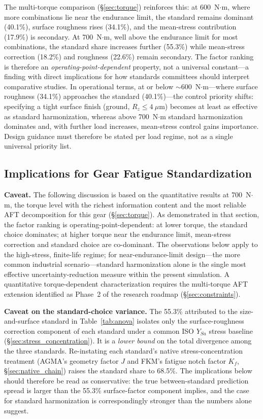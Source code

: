 \documentclass[twocolumn,12pt,a4paper]{article}
\begin{document}
The multi-torque comparison (\S\ref{sec:torque}) reinforces this:
at 600~N$\cdot$m, where more combinations lie near the endurance
limit, the standard remains dominant (40.1\%), surface roughness rises
(34.1\%), and the mean-stress contribution (17.9\%) is secondary. At
700~N$\cdot$m, well above the endurance limit for most combinations,
the standard share increases further (55.3\%) while mean-stress
correction (18.2\%) and roughness (22.6\%) remain secondary. The
factor ranking is therefore an
\emph{operating-point-dependent}
property, not a universal constant---a finding with direct implications
for how standards committees should interpret comparative studies. In
operational terms, at or below $\sim$600~N$\cdot$m---where surface
roughness (34.1\%) approaches the standard (40.1\%)---the control
priority shifts: specifying a tight surface finish (ground,
$R_z \leq 4~\mu$m) becomes at least as effective as standard
harmonization, whereas above 700~N$\cdot$m standard harmonization
dominates and, with further load increases, mean-stress control gains
importance. Design guidance must therefore be stated per load regime,
not as a single universal priority list.

\subsection{Implications for Gear Fatigue Standardization}

\textbf{Caveat.} The following discussion is based on the quantitative
results at 700~N$\cdot$m, the torque level with the richest
information content and the most reliable AFT decomposition for this
gear (\S\ref{sec:torque}). As
demonstrated in that section, the factor ranking is
operating-point-dependent: at lower torque, the standard choice
dominates; at higher torque near the endurance limit, mean-stress
correction and standard choice are co-dominant. The observations below
apply to
the high-stress, finite-life regime; for near-endurance-limit
design---the more common industrial scenario---standard harmonization
alone is the single most effective uncertainty-reduction measure
within the present simulation. A quantitative torque-dependent
characterization requires the
multi-torque AFT extension identified as Phase~2 of the research
roadmap (\S\ref{sec:constraints}).

\textbf{Caveat on the standard-choice variance.} The 55.3\% attributed
to the size-and-surface standard in Table~\ref{tab:anova} isolates
only the surface-roughness correction component of each standard
under a common ISO $Y_{Sa}$ stress baseline
(\S\ref{sec:stress_concentration}). It is a \emph{lower bound} on the
total divergence among the three standards. Re-instating each
standard's native stress-concentration treatment (AGMA's geometry
factor $J$ and FKM's fatigue notch factor $K_f$, \S\ref{sec:native_chain})
raises the standard share to 68.5\%. The implications
below should therefore be read as conservative: the true
between-standard prediction spread is larger than the 55.3\%
surface-factor component implies, and the case for standard
harmonization is correspondingly stronger than the numbers alone
suggest.
\end{document}

